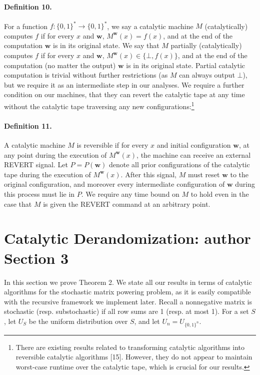 \paragraph{Definition 10.} For a function $f:\{0,1\}^*\to\{0,1\}^*$, we say a catalytic machine $M$ (catalytically) computes $f$ if for every $x$ and $\mathbf{w}$, $M^{\mathbf{w}}(x)=f(x)$, and at the end of the computation $\mathbf{w}$ is in its original state. We say that $M$ partially (catalytically) computes $f$ if for every $x$ and $\mathbf{w}$, $M^{\mathbf{w}}(x)\in\{\bot,f(x)\}$, and at the end of the computation (no matter the output) $\mathbf{w}$ is in its original state.
Partial catalytic computation is trivial without further restrictions (as $M$ can always output $\bot$), but we require it as an intermediate step in our analyses. We require a further condition on our machines, that they can revert the catalytic tape at any time without the catalytic tape traversing any new configurations:\footnote{There are existing results related to transforming catalytic algorithms into reversible catalytic algorithms [15]. However, they do not appear to maintain worst-case runtime over the catalytic tape, which is crucial for our results.}
\paragraph{Definition 11.} A catalytic machine $M$ is reversible if for every $x$ and initial configuration $\mathbf{w}$, at any point during the execution of $M^{\mathbf{w}}(x)$, the machine can receive an external REVERT signal. Let $P=P(\mathbf{w})$ denote all prior configurations of the catalytic tape during the execution of $M^{\mathbf{w}}(x)$. After this signal, $M$ must reset $\mathbf{w}$ to the original configuration, and moreover every intermediate configuration of $\mathbf{w}$ during this process must lie in $P$. We require any time bound on $M$ to hold even in the case that $M$ is given the REVERT command at an arbitrary point.
\section*{Catalytic Derandomization: author Section 3}
In this section we prove Theorem 2. We state all our results in terms of catalytic algorithms for the stochastic matrix powering problem, as it is easily compatible with the recursive framework we implement later. Recall a nonnegative matrix is stochastic (resp. substochastic) if all row sums are 1 (resp. at most 1). For a set $S$, let $U_S$ be the uniform distribution over $S$, and let $U_n=U_{\{0,1\}^n}$.
